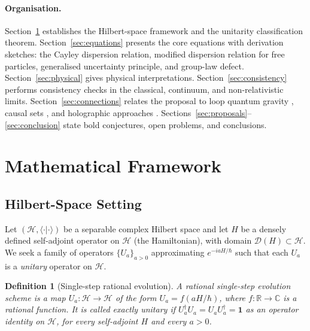 \documentclass[12pt,a4paper]{article}
\newtheorem{definition}{Definition}
\begin{document}
\paragraph{Organisation.}
Section~\ref{sec:framework} establishes the Hilbert-space framework and the unitarity
classification theorem. Section~\ref{sec:equations} presents the core equations with
derivation sketches: the Cayley dispersion relation, modified dispersion relation for
free particles, generalised uncertainty principle, and group-law defect.
Section~\ref{sec:physical} gives physical interpretations.
Section~\ref{sec:consistency} performs consistency checks in the classical, continuum, and
non-relativistic limits. Section~\ref{sec:connections} relates the proposal to loop
quantum gravity \cite{thiemann1996,ashtekar2004}, causal sets \cite{henson2006}, and
holographic approaches \cite{maldacena1997,witten1998,skenderis2002}.
Sections~\ref{sec:proposals}--\ref{sec:conclusion} state bold conjectures, open problems,
and conclusions.

\section{Mathematical Framework}
\label{sec:framework}

\subsection{Hilbert-Space Setting}
\label{sec:hilbert}

Let $(\mathcal{H}, \langle\cdot|\cdot\rangle)$ be a separable complex Hilbert space and
let $H$ be a densely defined self-adjoint operator on $\mathcal{H}$ (the Hamiltonian),
with domain $\mathcal{D}(H) \subset \mathcal{H}$.  We seek a family of operators
$\{U_a\}_{a > 0}$ approximating $e^{-iaH/\hbar}$ such that each $U_a$ is a \emph{unitary}
operator on $\mathcal{H}$.

\begin{definition}[Single-step rational evolution]\label{def:rational_evolution}
A \emph{rational single-step evolution scheme} is a map $U_a : \mathcal{H} \to \mathcal{H}$
of the form $U_a = f(aH/\hbar)$, where $f : \mathbb{R} \to \mathbb{C}$ is a rational
function.  It is called \emph{exactly unitary} if $U_a^\dagger U_a = U_a U_a^\dagger =
\mathbf{1}$ as an operator identity on $\mathcal{H}$, for every self-adjoint $H$ and every
$a > 0$.
\end{definition}
\end{document}
